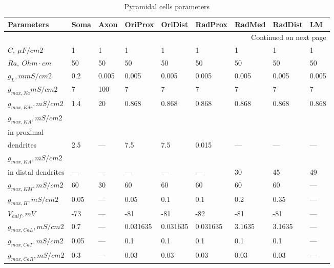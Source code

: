 {\footnotesize
\begin{longtable}{lllllllll}

\caption{Pyramidal cells parameters}
\label{tabel:ca1_pyramidal_cell_parameters}\\
\toprule
Parameters &     Soma &   Axon &   OriProx &   OriDist &   RadProx &  RadMed & RadDist &     LM \\
\midrule
\endhead
\midrule
\multicolumn{9}{r}{{Continued on next page}} \\
\midrule
\endfoot

\bottomrule
\endlastfoot

$C, \ \mu F/cm2$ &        1 &      1 &         1 &         1 &         1 &       1 &       1 &      1 \\
$Ra, \ Ohm \cdot cm$ &       50 &     50 &        50 &        50 &        50 &      50 &      50 &     50 \\
$g_L,mmS/cm2$ &      0.2 &  0.005 &     0.005 &     0.005 &     0.005 &   0.005 &   0.005 &  0.005 \\
$g_{max, Na} mS/cm2$ &        7 &    100 &         7 &         7 &         7 &       7 &       7 &      7 \\
$g_{max, Kdr}, mS/cm2$ &      1.4 &     20 &     0.868 &     0.868 &     0.868 &   0.868 &   0.868 &  0.868 \\
$ g_{max, KA}, mS/cm2$ \\ in proximal \\ dendrites&      2.5 &    --- &       7.5 &       7.5 &     0.015 &     --- &     --- &    --- \\
$g_{max, KA}, mS/cm2$ \\ in distal dendrites &      --- &    --- &       --- &       --- &       --- &      30 &      45 &     49 \\
$g_{max, KM}, mS/cm2 $ &       60 &     30 &        60 &        60 &        60 &      60 &      60 &    --- \\
$ g_{max, H}, mS/cm2 $ &     0.05 &    --- &      0.05 &       0.1 &       0.1 &     0.2 &    0.35 &    --- \\
$ V_{half}, mV$ &      -73 &    --- &       -81 &       -81 &       -82 &     -81 &     -81 &    --- \\
$g_{max, CaL}, mS/cm2 $ &      0.7 &    --- &  0.031635 &  0.031635 &  0.031635 &  3.1635 &  3.1635 &    --- \\
$g_{max, CaT}, mS/cm2 $ &     0.05 &    --- &       0.1 &       0.1 &       0.1 &     0.1 &     0.1 &    --- \\
$g_{max, CaR}, mS/cm2 $ &      0.3 &    --- &      0.03 &      0.03 &      0.03 &    0.03 &    0.03 &    --- \\

\end{longtable}}
